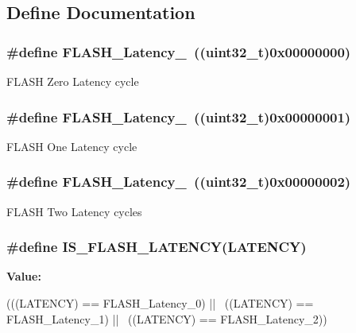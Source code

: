\subsection{Define Documentation}
\hypertarget{group__Flash__Latency_ga09afe6e52b819cc074f6111ec42ac3c3}{
\subsubsection[{FLASH\_\-Latency\_\-0}]{\setlength{\rightskip}{0pt plus 5cm}\#define FLASH\_\-Latency\_~((uint32\_\-t)0x00000000)}}
\label{group__Flash__Latency_ga09afe6e52b819cc074f6111ec42ac3c3}
FLASH Zero Latency cycle \hypertarget{group__Flash__Latency_ga6b7281665340fe8f7919bdfcfd06f8e6}{
\subsubsection[{FLASH\_\-Latency\_\-1}]{\setlength{\rightskip}{0pt plus 5cm}\#define FLASH\_\-Latency\_~((uint32\_\-t)0x00000001)}}
\label{group__Flash__Latency_ga6b7281665340fe8f7919bdfcfd06f8e6}
FLASH One Latency cycle \hypertarget{group__Flash__Latency_ga55173ebb5c978459ce18d5e2516e3e89}{
\subsubsection[{FLASH\_\-Latency\_\-2}]{\setlength{\rightskip}{0pt plus 5cm}\#define FLASH\_\-Latency\_~((uint32\_\-t)0x00000002)}}
\label{group__Flash__Latency_ga55173ebb5c978459ce18d5e2516e3e89}
FLASH Two Latency cycles \hypertarget{group__Flash__Latency_gafcbd098d482318a622a58bf168547389}{
\subsubsection[{IS\_\-FLASH\_\-LATENCY}]{\setlength{\rightskip}{0pt plus 5cm}\#define IS\_\-FLASH\_\-LATENCY(LATENCY)}}
\label{group__Flash__Latency_gafcbd098d482318a622a58bf168547389}
{\bfseries Value:}
\begin{DoxyCode}
(((LATENCY) == FLASH_Latency_0) || \
                                   ((LATENCY) == FLASH_Latency_1) || \
                                   ((LATENCY) == FLASH_Latency_2))
\end{DoxyCode}
